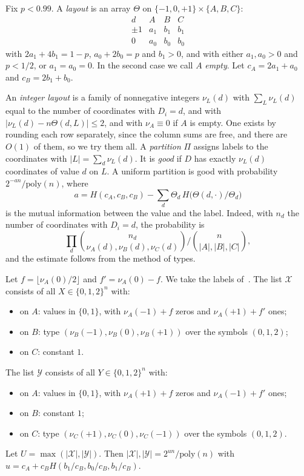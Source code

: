 \documentclass[11pt]{article}
\theoremstyle{remark}
\newcommand{\Xs}{\mathcal X}
\newcommand{\Ys}{\mathcal Y}
\begin{document}
Fix $p<0.99$. A \emph{layout} is an array $\Theta$ on $\{-1,0,+1\}\times\{A,B,C\}$:
\[
\begin{array}{c|ccc}
d & A & B & C\\\hline
\pm1 & a_1 & b_1 & b_1\\
0 & a_0 & b_0 & b_0
\end{array}
\]
with $2a_1+4b_1=1-p$, $a_0+2b_0=p$ and $b_1>0$, and with either $a_1,a_0>0$ and $p<1/2$, or $a_1=a_0=0$. In the second case we call $A$ \emph{empty}. Let $c_A=2a_1+a_0$ and $c_B=2b_1+b_0$.

An \emph{integer layout} is a family of nonnegative integers $\nu_L(d)$ with $\sum_L\nu_L(d)$ equal to the number of coordinates with $D_i=d$, and with $|\nu_L(d)-n\Theta(d,L)|\le2$, and with $\nu_A\equiv0$ if $A$ is empty. One exists by rounding each row separately, since the column sums are free, and there are $O(1)$ of them, so we try them all. A \emph{partition} $\Pi$ assigns labels to the coordinates with $|L|=\sum_d\nu_L(d)$. It is \emph{good} if $D$ has exactly $\nu_L(d)$ coordinates of value $d$ on $L$. A uniform partition is good with probability $2^{-an}/\mathrm{poly}(n)$, where
\[
a=H(c_A,c_B,c_B)-\sum_d\Theta_d\,H\bigl(\Theta(d,\cdot)/\Theta_d\bigr)
\]
is the mutual information between the value and the label. Indeed, with $n_d$ the number of coordinates with $D_i=d$, the probability is
\[
\prod_d\binom{n_d}{\nu_A(d),\nu_B(d),\nu_C(d)}\Big/\binom{n}{|A|,|B|,|C|},
\]
and the estimate follows from the method of types.

Let $f=\lfloor\nu_A(0)/2\rfloor$ and $f'=\nu_A(0)-f$. We take the labels of~\cite{Ye26}. The list $\Xs$ consists of all $X\in\{0,1,2\}^n$ with:
\begin{itemize}[leftmargin=1.5em]
\item on $A$: values in $\{0,1\}$, with $\nu_A(-1)+f$ zeros and $\nu_A(+1)+f'$ ones;
\item on $B$: type $(\nu_B(-1),\nu_B(0),\nu_B(+1))$ over the symbols $(0,1,2)$;
\item on $C$: constant $1$.
\end{itemize}
The list $\Ys$ consists of all $Y\in\{0,1,2\}^n$ with:
\begin{itemize}[leftmargin=1.5em]
\item on $A$: values in $\{0,1\}$, with $\nu_A(+1)+f$ zeros and $\nu_A(-1)+f'$ ones;
\item on $B$: constant $1$;
\item on $C$: type $(\nu_C(+1),\nu_C(0),\nu_C(-1))$ over the symbols $(0,1,2)$.
\end{itemize}
Let $U=\max(|\Xs|,|\Ys|)$. Then $|\Xs|,|\Ys|=2^{un}/\mathrm{poly}(n)$ with $u=c_A+c_BH(b_1/c_B,b_0/c_B,b_1/c_B)$.
\end{document}

